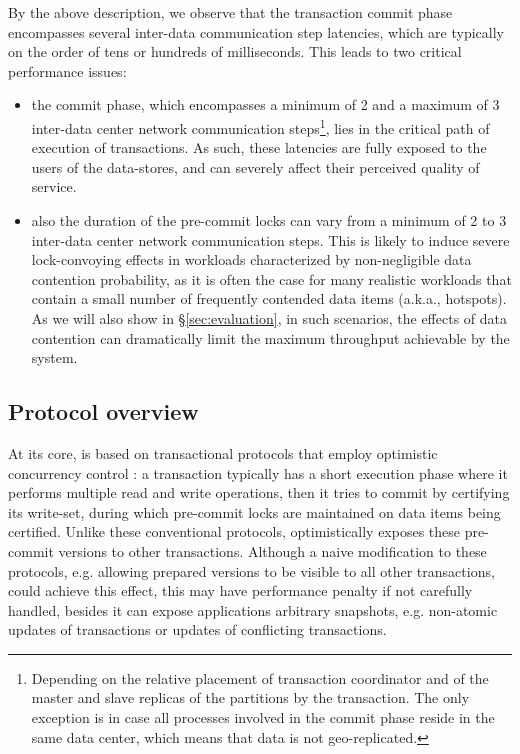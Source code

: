 By the above description, we observe that the transaction commit phase encompasses several inter-data communication step latencies, which are typically on the order of tens or hundreds of milliseconds. This leads to two critical performance issues:
\begin{itemize}
\item the commit phase, which encompasses a minimum of 2 and a maximum of 3 inter-data center network communication steps\footnote{Depending on the relative placement of transaction coordinator and of the master and slave replicas of the partitions by the transaction. The only exception is in case all processes involved in the commit phase reside in the same data center, which means that data is not geo-replicated.}, lies in the critical path of execution of transactions. As such, these latencies are fully exposed to the users of the data-stores, and can severely affect their perceived quality of service.
\item also the duration of the pre-commit locks can vary from a minimum of 2 to 3 inter-data center network communication steps. This is likely to induce severe lock-convoying effects in workloads characterized by non-negligible data contention probability, as it is often the case for many realistic workloads that contain a small number of frequently contended data items (a.k.a., hotspots). As we will also show in \S \ref{sec:evaluation}, in such scenarios, the effects of data contention can dramatically limit the maximum throughput achievable by the system.
\end{itemize}
\fi

\subsection{Protocol overview}
\label{sub:sc}
At its core, \specula is based on transactional protocols that employ optimistic concurrency control \cite{clocksi, mdcc}: a transaction typically has a short execution phase where it performs multiple read and write operations, then it tries to commit by certifying its write-set, during which pre-commit locks are maintained on data items being certified. Unlike these conventional protocols, \specula optimistically exposes these pre-commit versions to other transactions. Although a naive modification to these protocols, e.g. allowing prepared versions to be visible to all other transactions, could achieve this effect, this may have performance penalty if not carefully handled, besides it can expose applications arbitrary snapshots, e.g. non-atomic updates of transactions or updates of conflicting transactions.

